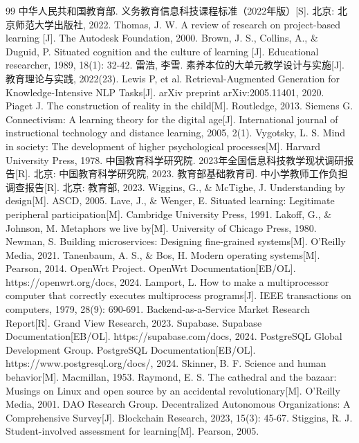 \documentclass[12pt,a4paper,fontset=fandol]{ctexart}
\begin{document}
\begin{thebibliography}{99}
 中华人民共和国教育部. 义务教育信息科技课程标准（2022年版）[S]. 北京: 北京师范大学出版社, 2022.
 Thomas, J. W. A review of research on project-based learning [J]. The Autodesk Foundation, 2000.
 Brown, J. S., Collins, A., \& Duguid, P. Situated cognition and the culture of learning [J]. Educational researcher, 1989, 18(1): 32-42.
 雷浩, 李雪. 素养本位的大单元教学设计与实施[J]. 教育理论与实践, 2022(23).
 Lewis P, et al. Retrieval-Augmented Generation for Knowledge-Intensive NLP Tasks[J]. arXiv preprint arXiv:2005.11401, 2020.
 Piaget J. The construction of reality in the child[M]. Routledge, 2013.
 Siemens G. Connectivism: A learning theory for the digital age[J]. International journal of instructional technology and distance learning, 2005, 2(1).
 Vygotsky, L. S. Mind in society: The development of higher psychological processes[M]. Harvard University Press, 1978.
 中国教育科学研究院. 2023年全国信息科技教学现状调研报告[R]. 北京: 中国教育科学研究院, 2023.
 教育部基础教育司. 中小学教师工作负担调查报告[R]. 北京: 教育部, 2023.
 Wiggins, G., \& McTighe, J. Understanding by design[M]. ASCD, 2005.
 Lave, J., \& Wenger, E. Situated learning: Legitimate peripheral participation[M]. Cambridge University Press, 1991.
 Lakoff, G., \& Johnson, M. Metaphors we live by[M]. University of Chicago Press, 1980.
 Newman, S. Building microservices: Designing fine-grained systems[M]. O'Reilly Media, 2021.
 Tanenbaum, A. S., \& Bos, H. Modern operating systems[M]. Pearson, 2014.
 OpenWrt Project. OpenWrt Documentation[EB/OL]. https://openwrt.org/docs, 2024.
 Lamport, L. How to make a multiprocessor computer that correctly executes multiprocess programs[J]. IEEE transactions on computers, 1979, 28(9): 690-691.
 Backend-as-a-Service Market Research Report[R]. Grand View Research, 2023.
 Supabase. Supabase Documentation[EB/OL]. https://supabase.com/docs, 2024.
 PostgreSQL Global Development Group. PostgreSQL Documentation[EB/OL]. https://www.postgresql.org/docs/, 2024.
 Skinner, B. F. Science and human behavior[M]. Macmillan, 1953.
 Raymond, E. S. The cathedral and the bazaar: Musings on Linux and open source by an accidental revolutionary[M]. O'Reilly Media, 2001.
 DAO Research Group. Decentralized Autonomous Organizations: A Comprehensive Survey[J]. Blockchain Research, 2023, 15(3): 45-67.
 Stiggins, R. J. Student-involved assessment for learning[M]. Pearson, 2005.
\end{thebibliography}
\end{document}
